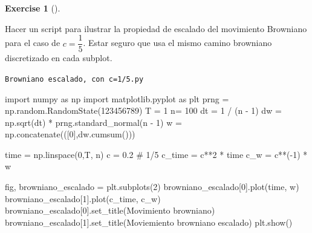 \documentclass[
  letterpaper,
  DIV=11,
  numbers=noendperiod]{scrreprt}
\newenvironment{Shaded}{\begin{snugshade}}{\end{snugshade}}
\newcommand{\CommentTok}[1]{\textcolor[rgb]{0.37,0.37,0.37}{#1}}
\newcommand{\DecValTok}[1]{\textcolor[rgb]{0.68,0.00,0.00}{#1}}
\newcommand{\FloatTok}[1]{\textcolor[rgb]{0.68,0.00,0.00}{#1}}
\newcommand{\ImportTok}[1]{\textcolor[rgb]{0.00,0.46,0.62}{#1}}
\newcommand{\NormalTok}[1]{\textcolor[rgb]{0.00,0.23,0.31}{#1}}
\newcommand{\OperatorTok}[1]{\textcolor[rgb]{0.37,0.37,0.37}{#1}}
\newcommand{\StringTok}[1]{\textcolor[rgb]{0.13,0.47,0.30}{#1}}
\theoremstyle{plain}
\theoremstyle{definition}
\newtheorem{exercise}{Exercise}[chapter]
\theoremstyle{remark}
\begin{document}
\begin{exercise}[]\protect\hypertarget{exr-2}{}\label{exr-2}

Hacer un script para ilustrar la propiedad de escalado del movimiento
Browniano para el caso de \(c = \dfrac{1}{5}\). Estar seguro que usa el
mismo camino browniano discretizado en cada subplot.

\end{exercise}

\begin{codelisting}

\caption{\texttt{Browniano escalado, con c=1/5.py}}

\begin{Shaded}
\begin{Highlighting}[]
\ImportTok{import}\NormalTok{ numpy }\ImportTok{as}\NormalTok{ np}
\ImportTok{import}\NormalTok{ matplotlib.pyplot }\ImportTok{as}\NormalTok{ plt}
\NormalTok{prng }\OperatorTok{=}\NormalTok{ np.random.RandomState(}\DecValTok{123456789}\NormalTok{)}
\NormalTok{T }\OperatorTok{=} \DecValTok{1}  
\NormalTok{n}\OperatorTok{=} \DecValTok{100}  
\NormalTok{dt }\OperatorTok{=} \DecValTok{1} \OperatorTok{/}\NormalTok{ (n }\OperatorTok{{-}} \DecValTok{1}\NormalTok{)}
\NormalTok{dw }\OperatorTok{=}\NormalTok{ np.sqrt(dt) }\OperatorTok{*}\NormalTok{ prng.standard\_normal(n }\OperatorTok{{-}} \DecValTok{1}\NormalTok{) }
\NormalTok{w }\OperatorTok{=}\NormalTok{ np.concatenate(([}\DecValTok{0}\NormalTok{],dw.cumsum()))}

\NormalTok{time }\OperatorTok{=}\NormalTok{ np.linspace(}\DecValTok{0}\NormalTok{,T, n)}
\NormalTok{c }\OperatorTok{=} \FloatTok{0.2}  \CommentTok{\# 1/5}
\NormalTok{c\_time }\OperatorTok{=}\NormalTok{ c}\OperatorTok{**}\DecValTok{2} \OperatorTok{*}\NormalTok{ time  }
\NormalTok{c\_w }\OperatorTok{=}\NormalTok{ c}\OperatorTok{**}\NormalTok{(}\OperatorTok{{-}}\DecValTok{1}\NormalTok{) }\OperatorTok{*}\NormalTok{ w  }

\NormalTok{fig, browniano\_escalado }\OperatorTok{=}\NormalTok{ plt.subplots(}\DecValTok{2}\NormalTok{)}
\NormalTok{browniano\_escalado[}\DecValTok{0}\NormalTok{].plot(time, w)}
\NormalTok{browniano\_escalado[}\DecValTok{1}\NormalTok{].plot(c\_time, c\_w)}
\NormalTok{browniano\_escalado[}\DecValTok{0}\NormalTok{].set\_title(}\StringTok{\textquotesingle{}Movimiento browniano\textquotesingle{}}\NormalTok{)}
\NormalTok{browniano\_escalado[}\DecValTok{1}\NormalTok{].set\_title(}\StringTok{\textquotesingle{}Moviemiento browniano escalado\textquotesingle{}}\NormalTok{)}
\NormalTok{plt.show()}
\end{Highlighting}
\end{Shaded}

\end{codelisting}
\end{document}
